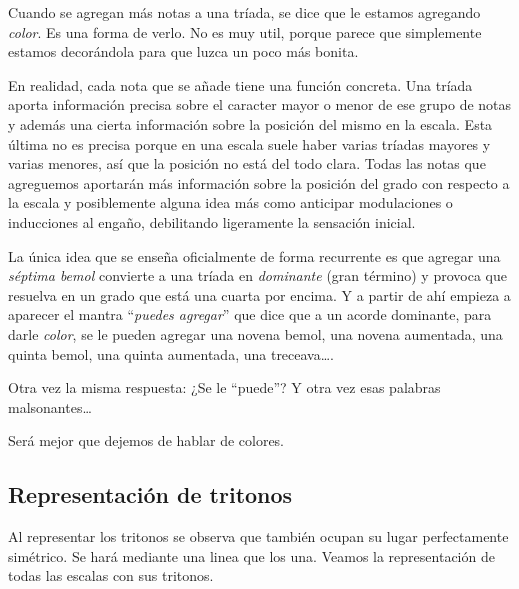 \documentclass[]{report}
\begin{document}
Cuando se agregan más notas a una tríada, se dice que le estamos agregando \emph{color}. Es una forma de verlo. No es muy util, porque parece que simplemente estamos decorándola para que luzca un poco más bonita.

En realidad, cada nota que se añade tiene una función concreta. Una tríada aporta información precisa sobre el caracter mayor o menor de ese grupo de notas y además una cierta información sobre la posición del mismo en la escala. Esta última no es precisa porque en una escala suele haber varias tríadas mayores y varias menores, así que la posición no está del todo clara. Todas las notas que agreguemos aportarán más información sobre la posición del grado con respecto a la escala y posiblemente alguna idea más como anticipar modulaciones o inducciones al engaño, debilitando ligeramente la sensación inicial.

La única idea que se enseña oficialmente de forma recurrente es que agregar una \emph{séptima bemol} convierte a una tríada en \emph{dominante} (gran término) y provoca que resuelva en un grado que está una cuarta por encima. Y a partir de ahí empieza a aparecer el mantra ``\emph{puedes agregar}'' que dice que a un acorde dominante, para darle \emph{color}, se le pueden agregar una novena bemol, una novena aumentada, una quinta bemol, una quinta aumentada, una treceava\ldots.

Otra vez la misma respuesta: ¿Se le ``puede''? Y otra vez esas palabras malsonantes\ldots{}

Será mejor que dejemos de hablar de colores.

\subsection{Representación de tritonos}

Al representar los tritonos se observa que también ocupan su lugar perfectamente simétrico. Se hará mediante una linea que los una. Veamos la representación de todas las escalas con sus tritonos.
\end{document}
